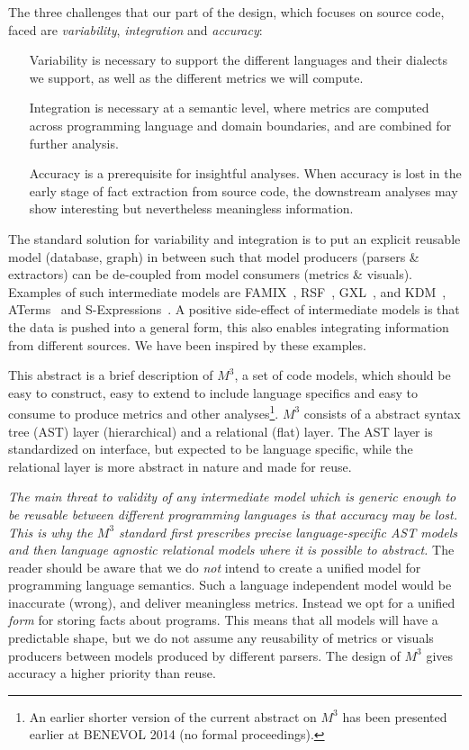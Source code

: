 \documentclass[conference]{IEEEtran}
\newcommand{\mthree}{\ensuremath{M^3}\xspace}
\begin{document}
The three challenges that our part of the design, which focuses on source code, faced
are \emph{variability}, \emph{integration} and \emph{accuracy}:
\begin{itemize}
\item[Variability] is necessary to support the different languages and their dialects we support, as well as the different metrics we will compute.
\item[Integration] is necessary at a semantic level, where metrics are computed across programming language and domain boundaries, and are combined for further analysis.
\item[Accuracy] is a prerequisite for insightful analyses. When accuracy is lost in the early stage of fact extraction from source code, the downstream analyses may show interesting but nevertheless meaningless information.
\end{itemize}
%
The standard solution for variability and integration is to put an explicit reusable model
(database, graph) in between such that model producers (parsers \& extractors)
can be de-coupled from model consumers (metrics \& visuals). Examples of such intermediate models are FAMIX~\cite{famix}, RSF~\cite{Mueller88}, GXL~\cite{GXL}, and KDM~\cite{omg-kdm}, ATerms~\cite{BJKO00} and
S-Expressions~\cite{sexpr}. A positive side-effect of intermediate models is that the data is pushed into a general form, this also enables integrating information from different sources. We have been inspired by these examples.


This abstract is a brief description of \mthree, a set of code models, which should be easy to
construct, easy to extend to include language specifics and easy to consume to produce metrics and other analyses\footnote{An earlier shorter version of the current abstract on \mthree has been presented earlier at BENEVOL 2014 (no formal proceedings).}. \mthree consists of a abstract syntax tree (AST) layer (hierarchical) and a relational (flat) layer. The AST layer is standardized on interface, but expected to be language specific, while the relational layer is more abstract in nature and made for reuse.

\emph{The main threat to validity of any intermediate model which is generic enough to be reusable between different programming languages is that accuracy may be lost. This is why the \mthree standard first prescribes precise language-specific AST models and then language agnostic relational models where it is possible to abstract.}
The reader should be aware that we do \emph{not} intend to
create a unified model for programming language semantics. Such a language
independent model would be inaccurate (wrong), and deliver meaningless
metrics. Instead we opt for a unified \emph{form} for storing facts about
programs. This means that all models will have a predictable shape, but we do
not assume any reusability of metrics or visuals producers between models
produced by different parsers. The design of \mthree  gives accuracy a higher priority than reuse.
\end{document}

